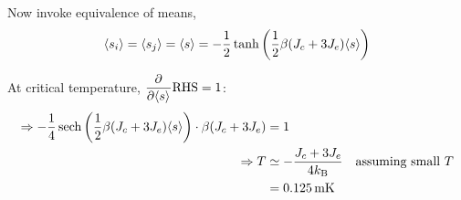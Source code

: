 \begin{parts}
	Now invoke equivalence of means,
	\begin{equation*}
		\langle s_i \rangle = \langle s_j \rangle = \langle s \rangle = -\frac{1}{2} \tanh\left(\frac{1}{2} \beta (J_c + 3J_e) \langle s \rangle\right)
	\end{equation*}
	
	At critical temperature, $\dfrac{\partial^{}}{\partial{}{\langle s \rangle}^{}} \textnormal{RHS} = 1$:
	\begin{align*}
		\Rightarrow -\frac{1}{4} \operatorname{sech}\left(\frac{1}{2} \beta (J_c + 3J_e) \langle s \rangle\right) \cdot \beta (J_c + 3J_e) &= 1 \\
		\Rightarrow T &\simeq -\frac{J_c + 3J_e}{4k_\mathrm{B}} \textnormal{\hspace{1em}assuming small $T$} \\
		&= \SI{0.125}{\milli\kelvin}
	\end{align*}
\end{parts}